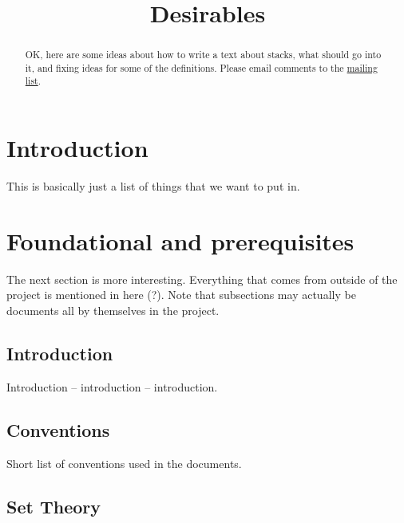 

%


\title{Desirables}

\begin{abstract}
OK, here are some ideas about how to write a text about 
stacks, what should go into it, and fixing ideas for some
of the definitions. Please email comments to the
\href{http://www.math.columbia.edu/mailman/listinfo/algebraic_geometry}%
{mailing list}.
\end{abstract}

\maketitle

\tableofcontents

\section{Introduction}
\label{section-introduction}

\noindent
This is basically just a list of things that we want to put in.

\section{Foundational and prerequisites}
\label{section-foundational}

\noindent
The next section is more interesting. Everything that comes from outside 
of the project is mentioned in here (?). Note that subsections may actually
be documents all by themselves in the project.

\subsection{Introduction}
\label{subsection-introduction}

\noindent
Introduction -- introduction -- introduction.

\subsection{Conventions}
\label{subsection-conventions}

\noindent
Short list of conventions used in the documents.

\subsection{Set Theory}
\label{subsection-set-theory}

